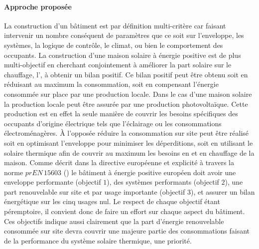 \paragraph{Approche proposée} %
\label{par:approche_proposee}
La construction d’un bâtiment est par définition multi-critère car faisant intervenir
un nombre conséquent de paramètres que ce soit sur l’enveloppe, les systèmes, la logique
de contrôle, le climat, ou bien le comportement des occupants.
La construction d’une maison solaire à énergie positive est de plus multi-objectif
en cherchant conjointement à améliorer la part solaire sur le chauffage, l’,
à obtenir un bilan positif. Ce bilan positif peut être obtenu soit en réduisant au
maximum la consommation, soit en compensant l’énergie consommée sur place par une production locale.
Dans le cas d’une maison solaire la production locale peut être assurée par une production
photovoltaïque. Cette production est en effet la seule manière de couvrir les besoins
spécifiques des occupants d’origine électrique tels que l’éclairage ou les consommations
électroménagères. À l’opposée réduire la consommation sur site peut être réalisé
soit en optimisant l’enveloppe pour minimiser les déperditions, soit en utilisant
le solaire thermique afin de couvrir au maximum les besoins en  et en chauffage
de la maison.
Comme décrit dans la directive européenne \parencite{EPBD2010} et explicité à travers
la norme $prEN\,15603$ () le bâtiment à énergie positive européen
doit avoir une enveloppe performante (objectif $1$), des systèmes performants (objectif $2$),
une part renouvelable sur site et par usage importante (objectif $3$), et assurer un
bilan énergétique sur les cinq usages nul.
Le respect de chaque objectif étant péremptoire, il convient donc de faire un effort
sur chaque aspect du bâtiment. Ces objectifs indique aussi clairement que la part
d’énergie renouvelable consommée sur site devra couvrir une majeure partie des
consommations faisant de la performance du système solaire thermique, une priorité.

